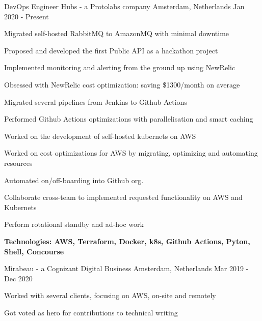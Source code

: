 


\begin{cventries}

\cventry
{DevOps Engineer} %
{Hubs - a Protolabs company} %
{Amsterdam, Netherlands} %
{Jan 2020 - Present} %
{ %
	\begin{cvitems}
		\item {Migrated self-hosted RabbitMQ to AmazonMQ with minimal downtime}
		\item {Proposed and developed the first Public API as a hackathon project}
		\item {Implemented monitoring and alerting from the ground up using NewRelic}
		\item {Obsessed with NewRelic cost optimization: saving \$1300/month on average}
		\item {Migrated several pipelines from Jenkins to Github Actions}
		\item {Performed Github Actions optimizations with parallelisation and smart caching}
		\item {Worked on the development of self-hosted kubernets on AWS}
		\item {Worked on cost optimizations for AWS by migrating, optimizing and automating resources}
		\item {Automated on/off-boarding into Github org.}
		\item {Collaborate cross-team to implemented requested functionality on AWS and Kubernets}
		\item {Perform rotational standby and ad-hoc work}
		\item {\bfseries{Technologies:} AWS, Terraform, Docker, k8s, Github Actions, Pyton, Shell, Concourse}
	\end{cvitems}
}


{Mirabeau - a Cognizant Digital Business}
{Amsterdam, Netherlands}
{Mar 2019 - Dec 2020}
{
	\begin{cvitems}
		\item {Worked with several clients, focusing on AWS, on-site and remotely}
		\item {Got voted as hero for contributions to technical writing}
	\end{cvitems}
}


\end{cventries}
